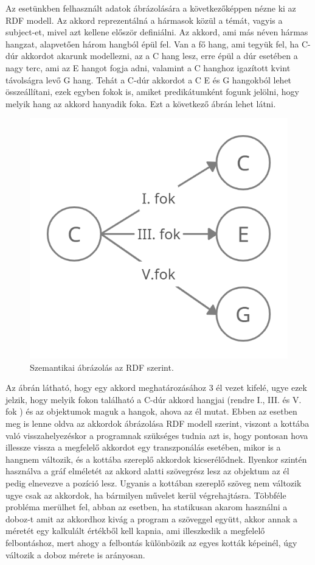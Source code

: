 
Az esetünkben felhasznált adatok ábrázolására a következőképpen nézne ki az RDF modell. Az akkord reprezentálná a hármasok közül a témát, vagyis a subject-et, mivel azt kellene először definiálni. Az akkord, ami más néven hármas hangzat, alapvetően három hangból épül fel. Van a fő hang, ami tegyük fel, ha C-dúr akkordot akarunk modellezni, az a C hang lesz, erre épül a dúr esetében a nagy terc, ami az E hangot fogja adni, valamint a C hanghoz igazított kvint távolságra levő G hang. Tehát a C-dúr akkordot a C E és G hangokból lehet összeállítani, ezek egyben fokok is, amiket predikátumként fogunk jelölni, hogy melyik hang az akkord hanyadik foka. Ezt a következő ábrán lehet látni.
\par
\begin{figure}[h]
	\includegraphics[scale=0.5]{images/rdf_graph.png}
	\caption{Szemantikai ábrázolás az RDF szerint.}
	\label{fig:graph1}
\end{figure}
\newpage
Az ábrán látható, hogy egy akkord meghatározásához 3 él vezet kifelé, ugye ezek jelzik, hogy melyik fokon található a C-dúr akkord hangjai (rendre I., III. és V. fok ) és az objektumok maguk a hangok, ahova az él mutat. Ebben az esetben meg is lenne oldva az akkordok ábrázolása RDF modell szerint, viszont a kottába való visszahelyezéskor a programnak szükséges tudnia azt is, hogy pontosan hova illessze vissza a megfelelő akkordot egy transzponálás esetében, mikor is a hangnem változik, és a kottába szereplő akkordok kicserélődnek. 
Ilyenkor szintén használva a gráf elméletét az akkord alatti szövegrész lesz az objektum az él pedig elnevezve a pozíció lesz. Ugyanis a kottában szereplő szöveg nem változik ugye csak az akkordok, ha bármilyen művelet kerül végrehajtásra. Többféle probléma merülhet fel, abban az esetben, ha statikusan akarom használni a doboz-t amit az akkordhoz kivág a program a szöveggel együtt, akkor annak a méretét egy kalkulált értékből kell kapnia, ami illeszkedik a megfelelő felbontáshoz, mert ahogy a felbontás különbözik az egyes kották képeinél, úgy változik a doboz mérete is arányosan.

